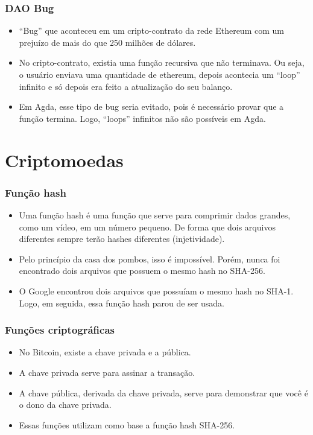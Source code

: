 \documentclass{beamer}
\begin{document}
\begin{frame}
  \frametitle{DAO Bug}
  \begin{itemize}
    \item \foreignquote{english}{Bug} que aconteceu em um cripto-contrato da rede Ethereum com um prejuízo de mais do que 250 milhões de dólares.
      \cite{wood2014ethereum}
    \item No cripto-contrato, existia uma função recursiva que não terminava.
      Ou seja, o usuário enviava uma quantidade de ethereum,
      depois acontecia um \foreignquote{english}{loop} infinito e só depois era feito a atualização do seu balanço.
    \item Em Agda, esse tipo de bug seria evitado, pois é necessário provar que a função termina.
      Logo, \foreignquote{english}{loops} infinitos não são possíveis em Agda.
  \end{itemize}
\end{frame}

\section{Criptomoedas}
\begin{frame}
  \frametitle{Função hash}
  \begin{itemize}
    \item Uma função hash é uma função que serve para comprimir dados grandes, como um vídeo,
      em um número pequeno.
      De forma que dois arquivos diferentes sempre terão hashes diferentes (injetividade).
    \item Pelo princípio da casa dos pombos, isso é impossível.
      Porém, nunca foi encontrado dois arquivos que possuem o mesmo hash no SHA-256.
    \item O Google encontrou dois arquivos que possuíam o mesmo hash no SHA-1.
      Logo, em seguida, essa função hash parou de ser usada.
  \end{itemize}
\end{frame}

\begin{frame}
  \frametitle{Funções criptográficas}
  \begin{itemize}
    \item No Bitcoin, existe a chave privada e a pública.
    \item A chave privada serve para assinar a transação.
    \item A chave pública, derivada da chave privada,
      serve para demonstrar que você é o dono da chave privada.
    \item Essas funções utilizam como base a função hash SHA-256.
  \end{itemize}
\end{frame}
\end{document}
